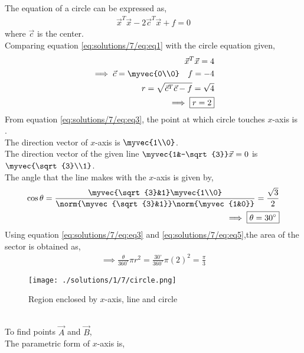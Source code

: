 The equation of a circle can be expressed as,
\begin{align}
    \vec{x}^{T}\vec{x} - 2\vec{c}^{T}\vec{x} +f=0 \label{eq:solutions/7/eq:eq1}
\end{align}
where $\vec{c}$ is the center.\\
Comparing equation \eqref{eq:solutions/7/eq:eq1} with the circle equation given,
\begin{align}
    \vec{x}^{T}\vec{x} =4 \label{eq:solutions/7/eq:eq2}\\
    \implies \vec{c} = \myvec{0\\0} \quad f=-4\\
    r=\sqrt{\vec{c}^{T}\vec{c}-f} = \sqrt{4}\\
    \implies \boxed{r=2} \label{eq:solutions/7/eq:eq3}
\end{align}
From equation \eqref{eq:solutions/7/eq:eq3}, the point at which circle touches $x$-axis is .\\
The direction vector of $x$-axis is $\myvec{1\\0}$.\\
The direction vector of the given line $\myvec{1&-\sqrt{3}}\vec{x}=0$ is $\myvec{\sqrt{3}\\1}$.\\
The angle that the line makes with the $x$-axis is given by,
\begin{align}
    \cos\theta = \frac{\myvec{\sqrt{3}&1}\myvec{1\\0}}{\norm{\myvec{\sqrt{3}&1}}\norm{\myvec{1&0}}}=\frac{\sqrt{3}}{2} \label{eq:solutions/7/eq:eq4}\\
    \implies \boxed{\theta = 30^{\circ}}\label{eq:solutions/7/eq:eq5}
\end{align}
Using equation \eqref{eq:solutions/7/eq:eq3} and \eqref{eq:solutions/7/eq:eq5},the area of the sector is obtained as,
\begin{align}
    \implies \boxed{\frac{\theta}{360^{\circ}}\pi r^2 = \frac{30^{\circ}}{360^{\circ}}\pi (2)^2=\frac{\pi}{3}} \label{eq:solutions/7/eq:eq6}
\end{align}
\begin{figure}[h!]
	\centering
	\texttt{[image: ./solutions/1/7/circle.png]}
	\caption{Region enclosed by $x$-axis, line and circle}
	\label{eq:solutions/7/myfig}
\end{figure}\\
To find points $\vec{A}$ and $\vec{B}$,\\
The parametric form of $x$-axis is,
